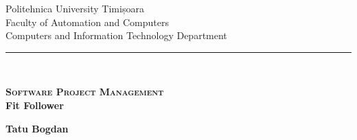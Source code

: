 \begin{titlepage}
    \begin{center}
        \begin{minipage}{0.3\textwidth}
        \end{minipage}%
        \begin{minipage}{0.4\textwidth}
            \centering
            \scriptsize
            Politehnica University Timișoara\\
            Faculty of Automation and Computers\\
            Computers and Information Technology Department
        \end{minipage}%
        \begin{minipage}{0.3\textwidth}
            \begin{flushright}
            \end{flushright}
        \end{minipage}
    \end{center}
    
    \noindent\rule{\textwidth}{1pt}\\[4.8cm]
    
    \begin{center}
        { \Huge \bfseries \textsc {Software Project Management} }\\[1cm]
        {\large \bfseries Fit Follower}\\[3.0cm]
        \begin{flushright}
            \large
            \textbf{Tatu Bogdan}\\[3.3cm]
        \end{flushright}
    \end{center}
\end{titlepage}
\restoregeometry
\shipout\null